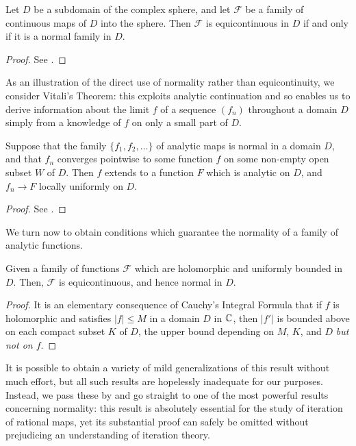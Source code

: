 \begin{theorem}
    Let $D$ be a subdomain of the complex sphere, and let $\mathcal{F}$ be a
    family of continuous maps of $D$ into the sphere. Then $\mathcal{F}$ is
    equicontinuous in $D$ if and only if it is a normal family in $D$.
\end{theorem}
\begin{proof}
    See \cite[222]{Ahlfors1979}.
\end{proof}

As an illustration of the direct use of normality rather than equicontinuity, we
consider Vitali's Theorem: this exploits analytic continuation and so enables us
to derive information about the limit $f$ of a sequence $(f_n)$ throughout a
domain $D$ simply from a knowledge of $f$ on only a small part of $D$.

\begin{theorem}
    \label{thm:Vitalis_theorem}
    Suppose that the family $\{f_1, f_2, \ldots\}$ of analytic maps is normal in
    a domain $D$, and that $f_n$ converges pointwise to some function $f$ on
    some non-empty open subset $W$ of $D$. Then $f$ extends to a function $F$
    which is analytic on $D$, and $f_n \to F$ locally uniformly on $D$.
\end{theorem}
\begin{proof}
    See \cite[56]{Beardon1991}.
\end{proof}

We turn now to obtain conditions which guarantee the normality of a family of
analytic functions.

\begin{proposition}
    Given a family of functions $\mathcal{F}$ which are holomorphic and
    uniformly bounded in $D$. Then, $\mathcal{F}$ is equicontinuous, and hence
    normal in $D$.
\end{proposition}
\begin{proof}
    It is an elementary consequence of Cauchy's Integral Formula that if $f$ is
    holomorphic and satisfies $|f| \leq M$ in a domain $D$ in $\mathbb{C}$, then $|f'|$
    is bounded above on each compact subset $K$ of $D$, the upper bound
    depending on $M$, $K$, and $D$ \emph{but not on $f$}.
\end{proof}

It is possible to obtain a variety of mild generalizations of this result
without much effort, but all such results are hopelessly inadequate for our
purposes. Instead, we pass these by and go straight to one of the most powerful
results concerning normality: this result is absolutely essential for the study
of iteration of rational maps, yet its substantial proof can safely be omitted
without prejudicing an understanding of iteration theory.

